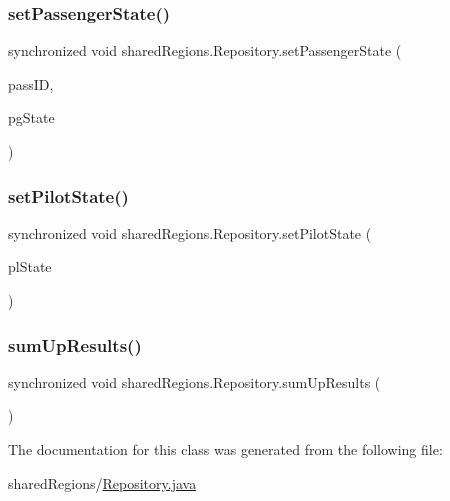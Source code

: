 \mbox{\label{classshared_regions_1_1_repository_a112f179c04b8e8c76afd4150f105315d}} 
\subsubsection{\texorpdfstring{set\+Passenger\+State()}{setPassengerState()}}
{\footnotesize\ttfamily synchronized void shared\+Regions.\+Repository.\+set\+Passenger\+State (\begin{DoxyParamCaption}\item[{int}]{pass\+ID,  }\item[{\hyperlink{enumentities_1_1_passenger_enum}{Passenger\+Enum}}]{pg\+State }\end{DoxyParamCaption})}

\mbox{\label{classshared_regions_1_1_repository_afe742ad0e099e2dc3f936ed2ae6fe32d}} 
\subsubsection{\texorpdfstring{set\+Pilot\+State()}{setPilotState()}}
{\footnotesize\ttfamily synchronized void shared\+Regions.\+Repository.\+set\+Pilot\+State (\begin{DoxyParamCaption}\item[{\hyperlink{enumentities_1_1_pilot_enum}{Pilot\+Enum}}]{pl\+State }\end{DoxyParamCaption})}

\mbox{\label{classshared_regions_1_1_repository_ad1f23250d858b294d3d443367c88a855}} 
\subsubsection{\texorpdfstring{sum\+Up\+Results()}{sumUpResults()}}
{\footnotesize\ttfamily synchronized void shared\+Regions.\+Repository.\+sum\+Up\+Results (\begin{DoxyParamCaption}{ }\end{DoxyParamCaption})}



The documentation for this class was generated from the following file\+:\begin{DoxyCompactItemize}
\item 
shared\+Regions/\hyperlink{_repository_8java}{Repository.\+java}\end{DoxyCompactItemize}
